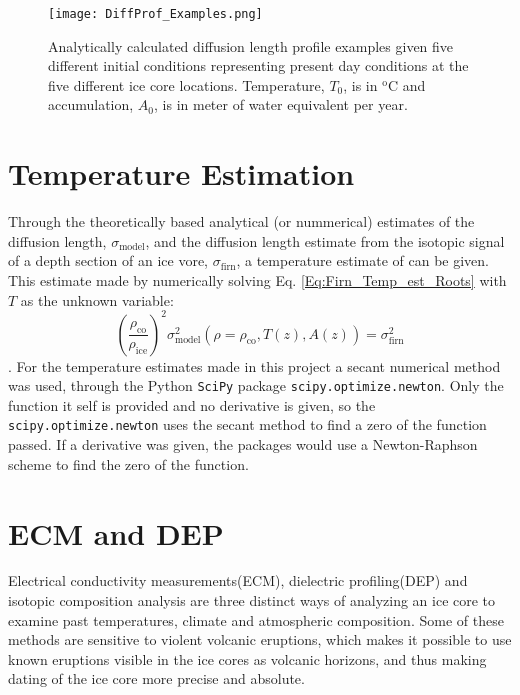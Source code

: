 \documentclass[../../CompleteThesis/Complete_1stDraft.tex]{subfiles}
\begin{document}
\begin{figure}
	\centering
	\texttt{[image: DiffProf\_Examples.png]}
	\caption{Analytically calculated diffusion length profile examples given five different initial conditions representing present day conditions at the five different ice core locations. Temperature, $T_0$, is in $^{\text{o}}$C and accumulation, $A_0$, is in meter of water equivalent per year.}
	\label{Fig:DiffProf_Examples}
\end{figure}


\section[Temperature Estimation]{Temperature Estimation}
\label{Sec:Ice_TempEstimation}
Through the theoretically based analytical (or nummerical) estimates of the diffusion length, $\sigma_{\text{model}}$, and the diffusion length estimate from the isotopic signal of a depth section of an ice vore, $\sigma_{\text{firn}}$, a temperature estimate of can be given. This estimate made by numerically solving Eq. \ref{Eq:Firn_Temp_est_Roots} with $T$ as the unknown variable:
\begin{equation}
	\left(\frac{\rho_{\text{co}}}{\rho_{\text{ice}}}\right)^2 \sigma_{\text{model}}^2(\rho=\rho_{\text{co}}, T(z), A(z)) = \sigma^2_{\text{firn}}
	\label{Eq:Firn_Temp_est_Roots2}
\end{equation}. For the temperature estimates made in this project a secant numerical method\cite{Press2007} was used, through the Python \lstinline[language=Python]|SciPy| package \lstinline[language=Python]|scipy.optimize.newton|. Only the function it self is provided and no derivative is given, so the \lstinline[language=Python]|scipy.optimize.newton| uses the secant method to find a zero of the function passed. If a derivative was given, the packages would use a Newton-Raphson\cite{Press2007} scheme to find the zero of the function.








\section[ECM and DEP][ECM and DEP]{ECM and DEP}
\label{Sec:Ice_ECMandDEP}
Electrical conductivity measurements(ECM), dielectric profiling(DEP) and isotopic composition analysis are three distinct ways of analyzing an ice core to examine past temperatures, climate and atmospheric composition. Some of these methods are sensitive to violent volcanic eruptions, which makes it possible to use known eruptions visible in the ice cores as volcanic horizons, and thus making dating of the ice core more precise and absolute.
\end{document}
